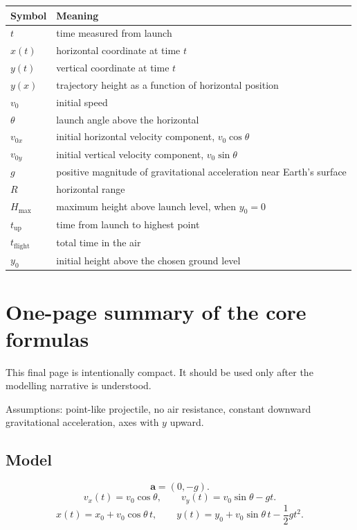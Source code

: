 \documentclass[11pt,a4paper]{article}
\newcommand{\vect}[1]{\boldsymbol{#1}}
\begin{document}
\begin{center}
\renewcommand{\arraystretch}{1.35}
\begin{tabular}{p{}p{}}
\toprule
Symbol & Meaning \\
\midrule
$t$ & time measured from launch \\
$x(t)$ & horizontal coordinate at time $t$ \\
$y(t)$ & vertical coordinate at time $t$ \\
$y(x)$ & trajectory height as a function of horizontal position \\
$v_0$ & initial speed \\
$\theta$ & launch angle above the horizontal \\
$v_{0x}$ & initial horizontal velocity component, $v_0\cos\theta$ \\
$v_{0y}$ & initial vertical velocity component, $v_0\sin\theta$ \\
$g$ & positive magnitude of gravitational acceleration near Earth's surface \\
$R$ & horizontal range \\
$H_{\max}$ & maximum height above launch level, when $y_0=0$ \\
$t_{\mathrm{up}}$ & time from launch to highest point \\
$t_{\mathrm{flight}}$ & total time in the air \\
$y_0$ & initial height above the chosen ground level \\
\bottomrule
\end{tabular}
\end{center}

\section{One-page summary of the core formulas}

This final page is intentionally compact. It should be used only after the modelling narrative is understood.

Assumptions: point-like projectile, no air resistance, constant downward gravitational acceleration, axes with $y$ upward.

\subsection*{Model}
\[
\vect a=(0,-g).
\]
\[
v_x(t)=v_0\cos\theta,
\qquad
v_y(t)=v_0\sin\theta-gt.
\]
\[
x(t)=x_0+v_0\cos\theta\,t,
\qquad
 y(t)=y_0+v_0\sin\theta\,t-\frac12gt^2.
\]
\end{document}
